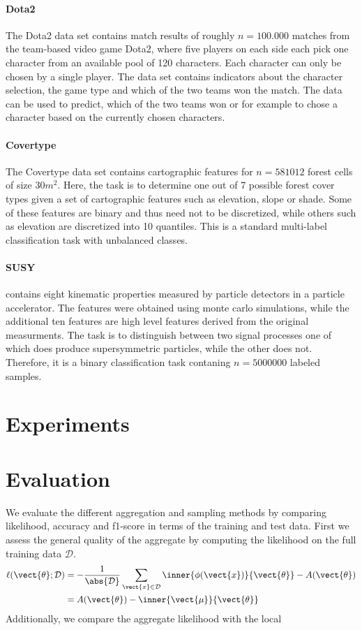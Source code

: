 \paragraph*{Dota2}
The Dota2 data set contains match results of roughly $n=100.000$ matches from the team-based video game Dota2, where five players on each side each pick one character from an available pool of 120 characters.
Each character can only be chosen by a single player.
The data set contains indicators about the character selection, the game type and which of the two teams won the match. 
The data can be used to predict, which of the two teams won or for example to chose a character based on the currently chosen characters.
\paragraph*{Covertype}
The Covertype data set contains cartographic features for  $n=581012$ forest cells of size $30m^2$.
Here, the task is to determine one out of 7 possible forest cover types given a set of cartographic features such as elevation, slope or shade. 
Some of these features are binary and thus need not to be discretized, while others such as elevation are discretized into 10 quantiles.
This is a standard multi-label classification task with unbalanced classes.

\paragraph*{SUSY}
contains eight kinematic properties measured by particle detectors in a particle accelerator. 
The features were obtained using monte carlo simulations, while the additional ten features are high level features derived from the original measurments.
The task is to distinguish between two signal processes one of which does produce supersymmetric particles, while the other does not. 
Therefore, it is a binary classification task contaning $n=5000000$ labeled samples.

\section{Experiments}

\section{Evaluation}
We evaluate the different aggregation and sampling methods by comparing likelihood, accuracy and f1-score in terms of the training and test data. 
First we assess the general quality of the aggregate by computing the likelihood on the full training data $\mathcal{D}$.
\begin{equation}
    \begin{split}
        \ell(\vect{\theta} ; \mathcal{D}) &= -\frac{1}{\abs{\mathcal{D}}} \sum_{\vect{x} \in \mathcal{D}} \inner{\phi(\vect{x})}{\vect{\theta}} - A(\vect{\theta}) \\    
        &= A(\vect{\theta}) - \inner{\vect{\mu}}{\vect{\theta}}
    \end{split}
\end{equation}
Additionally, we compare the aggregate likelihood with the local 
